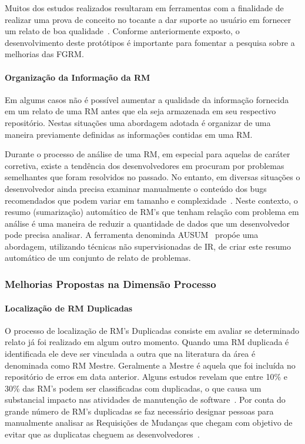 Muitos dos estudos realizados resultaram em ferramentas com a finalidade de
realizar uma prova de conceito no tocante a dar suporte ao usuário em fornecer
um relato de boa qualidade~\cite{Tu:2014:MQI:2677832.2677844, Bettenburg2008a,
	Wu2011a,White:2015:GRR:2820282.2820291,moran2015auto}. Conforme
anteriormente exposto, o desenvolvimento deste protótipos é importante para
fomentar a pesquisa sobre a melhorias das FGRM\@.

\paragraph{Organização da Informação da RM}

Em algums casos não é possível aumentar a qualidade da informação fornecida em
um relato de uma RM antes que ela seja armazenada em seu respectivo repositório.
Nestas situações uma abordagem adotada é organizar de uma maneira previamente
definidas as informações contidas em uma RM\@.

Durante o processo de análise de uma RM, em especial para aquelas de caráter
corretiva, existe a tendência dos desenvolvedores em procuram por problemas
semelhantes que foram resolvidos no passado. No entanto, em diversas situações o
desenvolvedor ainda precisa examinar manualmente o conteúdo dos bugs
recomendados que podem variar em tamanho e complexidade~\cite{mani2012ausum}.
Neste contexto, o resumo (sumarização) automático de RM's que tenham relação com
problema em análise é uma maneira de reduzir a quantidade de dados que um
desenvolvedor pode precisa analisar. A ferramenta denominda
AUSUM~\cite{mani2012ausum} propóe uma abordagem, utilizando técnicas não
supervisionadas de IR, de criar este resumo automático de um conjunto de relato
de problemas.

\subsubsection{Melhorias Propostas na Dimensão Processo}
\label{ssub:melhorias_dim_processo}

\paragraph{Localização de RM Duplicadas}
O processo de localização de RM's Duplicadas consiste em avaliar se determinado
relato já foi realizado em algum outro momento. Quando uma RM duplicada é
identificada ele deve ser vinculada a outra que na literatura da área é
denominada como RM Mestre. Geralmente a Mestre é aquela que foi incluída no
repositório de erros em data anterior. Alguns estudos revelam que entre 10\% e
30\% das RM's podem ser classificadas com duplicadas, o que causa um substancial
impacto nas atividades de manutenção de
software~\cite{anvik2005coping,cavalcanti2013bug,Runeson:2007:DDD:1248820.1248882}.
Por conta do grande número de RM's duplicadas se faz necessário designar pessoas
para manualmente analisar as Requisições de Mudanças que chegam com objetivo de
evitar que as duplicatas cheguem as desenvolvedores~\cite{anvik2005coping}.

